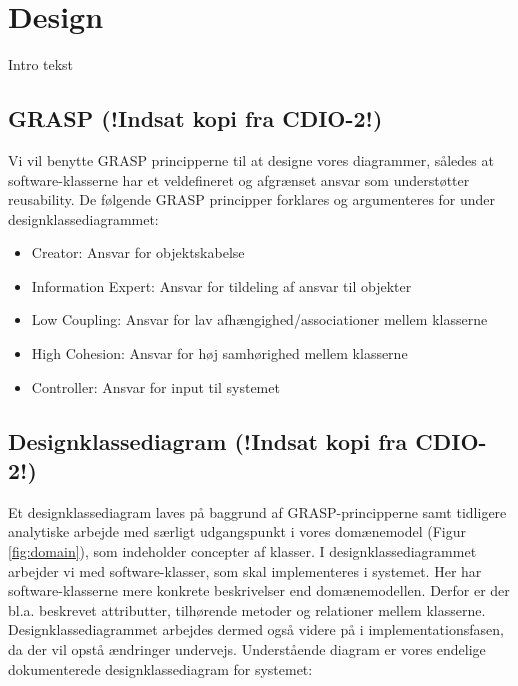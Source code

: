 \documentclass[../main.tex]{subfiles}
\begin{document}
\section{Design}

\begin{flushleft} 
Intro tekst
\end{flushleft}


\subsection{GRASP (!Indsat kopi fra CDIO-2!)}
\begin{flushleft}
Vi vil benytte GRASP principperne til at designe vores diagrammer, således at software-klasserne har et veldefineret og afgrænset ansvar som understøtter reusability. \newline
\newline
De følgende GRASP principper forklares og argumenteres for under designklassediagrammet:
\begin{itemize}
    \item Creator: Ansvar for objektskabelse
    \item Information Expert: Ansvar for tildeling af ansvar til objekter
    \item Low Coupling: Ansvar for lav afhængighed/associationer mellem klasserne
    \item High Cohesion: Ansvar for høj samhørighed mellem klasserne
    \item Controller: Ansvar for input til systemet
\end{itemize}
\end{flushleft}


\subsection{Designklassediagram (!Indsat kopi fra CDIO-2!)}
\begin{flushleft}
Et designklassediagram laves på baggrund af GRASP-principperne samt tidligere analytiske arbejde med særligt udgangspunkt i  vores domænemodel (Figur \ref{fig:domain}), som indeholder concepter af klasser. I designklassediagrammet arbejder vi med software-klasser, som skal implementeres i systemet. Her har software-klasserne mere konkrete beskrivelser end domænemodellen. Derfor er der bl.a. beskrevet attributter, tilhørende metoder og relationer mellem klasserne. Designklassediagrammet arbejdes dermed også videre på i implementationsfasen, da der vil opstå ændringer undervejs. Understående diagram er vores endelige dokumenterede designklassediagram for systemet:
\end{flushleft}
\end{document}

